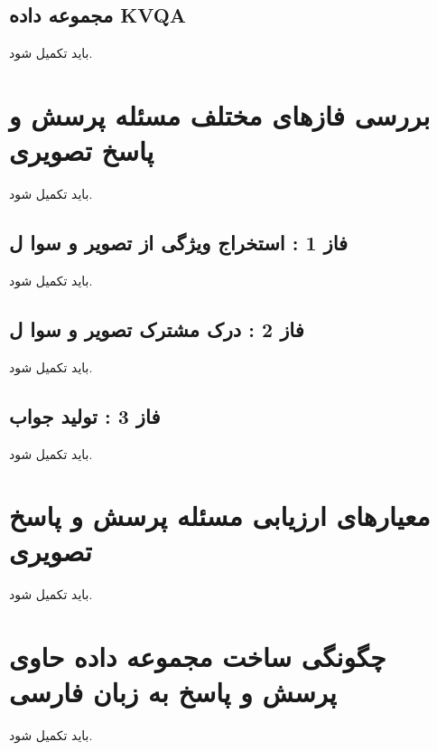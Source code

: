 \subsection{مجموعه داده KVQA}
باید تکمیل شود.
\section{بررسی فازهای مختلف مسئله پرسش و پاسخ تصویری}
باید تکمیل شود.
\subsection{فاز 1 : استخراج ویژگی از تصویر و سوا ل}
باید تکمیل شود.
\subsection{فاز 2 : درک مشترک تصویر و سوا ل}
باید تکمیل شود.
\subsection{فاز 3 : تولید جواب}
باید تکمیل شود.
\section{معیارهای ارزیابی مسئله پرسش و پاسخ تصویری}
باید تکمیل شود.
\section{ چگونگی ساخت مجموعه داده حاوی پرسش و پاسخ به زبان فارسی}
باید تکمیل شود.